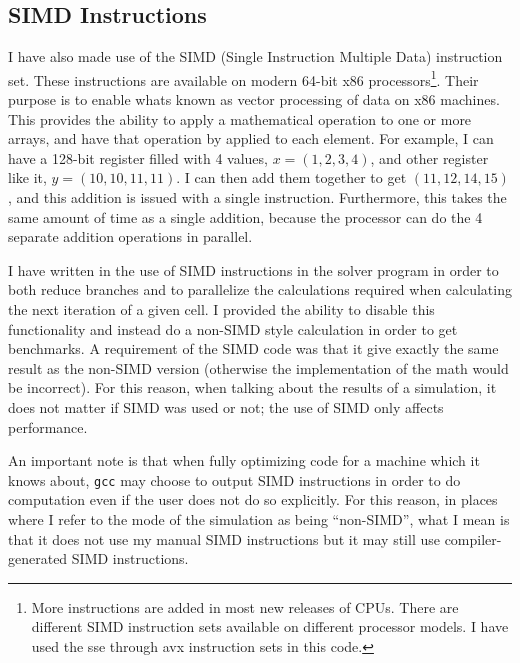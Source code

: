 \subsection{SIMD Instructions}
I have also made use of the SIMD (Single Instruction Multiple Data) instruction set. These instructions are available
on modern 64-bit x86 processors\cite{intel-3a}\footnote{More instructions are added in most new releases of CPUs. There are different
SIMD instruction sets available on different processor models. I have used the sse through avx instruction sets in this
code.}. Their purpose is to enable whats known as vector processing of data on x86 machines. This provides the ability
to apply a mathematical operation to one or more arrays, and have that operation by applied to each element. For example,
I can have a 128-bit register filled with 4 values, $x=(1,2,3,4)$, and other register like it, $y=(10, 10, 11, 11)$. I can
then add them together to get $(11, 12, 14, 15)$, and this addition is issued with a single instruction. Furthermore, this
takes the same amount of time as a single addition, because the processor can do the 4 separate addition operations in
parallel.

I have written in the use of SIMD instructions in the solver program in order to both reduce branches and to parallelize
the calculations required when calculating the next iteration of a given cell. I provided the ability to disable this
functionality and instead do a non-SIMD style calculation in order to get benchmarks. A requirement of the SIMD code was
that it give exactly the same result as the non-SIMD version (otherwise the implementation of the math would be incorrect).
For this reason, when talking about the results of a simulation, it does not matter if SIMD was used or not; the use
of SIMD only affects performance.

An important note is that when fully optimizing code for a machine which it knows about, \texttt{gcc} may choose to output
SIMD instructions in order to do computation even if the user does not do so explicitly. For this reason, in places where
I refer to the mode of the simulation as being ``non-SIMD'', what I mean is that it does not use my manual SIMD instructions
but it may still use compiler-generated SIMD instructions.

